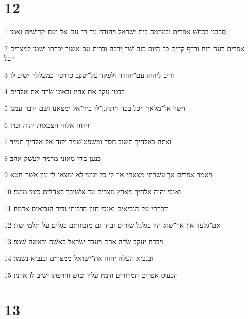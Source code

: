 \chapter{12}

\par 1 סבבני בכחשׁ אפרים ובמרמה בית ישׂראל ויהודה עד רד עם־אל ועם־קדושׁים נאמן׃
\par 2 אפרים רעה רוח ורדף קדים כל־היום כזב ושׁד ירבה וברית עם־אשׁור יכרתו ושׁמן למצרים יובל׃
\par 3 וריב ליהוה עם־יהודה ולפקד על־יעקב כדרכיו כמעלליו ישׁיב לו׃
\par 4 בבטן עקב את־אחיו ובאונו שׂרה את־אלהים׃
\par 5 וישׂר אל־מלאך ויכל בכה ויתחנן־לו בית־אל ימצאנו ושׁם ידבר עמנו׃
\par 6 ויהוה אלהי הצבאות יהוה זכרו׃
\par 7 ואתה באלהיך תשׁוב חסד ומשׁפט שׁמר וקוה אל־אלהיך תמיד׃
\par 8 כנען בידו מאזני מרמה לעשׁק אהב׃
\par 9 ויאמר אפרים אך עשׁרתי מצאתי און לי כל־יגיעי לא ימצאו־לי עון אשׁר־חטא׃
\par 10 ואנכי יהוה אלהיך מארץ מצרים עד אושׁיבך באהלים כימי מועד׃
\par 11 ודברתי על־הנביאים ואנכי חזון הרביתי וביד הנביאים אדמה׃
\par 12 אם־גלעד און אך־שׁוא היו בגלגל שׁורים זבחו גם מזבחותם כגלים על תלמי שׂדי׃
\par 13 ויברח יעקב שׂדה ארם ויעבד ישׂראל באשׁה ובאשׁה שׁמר׃
\par 14 ובנביא העלה יהוה את־ישׂראל ממצרים ובנביא נשׁמר׃
\par 15 הכעיס אפרים תמרורים ודמיו עליו יטושׁ וחרפתו ישׁיב לו אדניו׃

\chapter{13}

